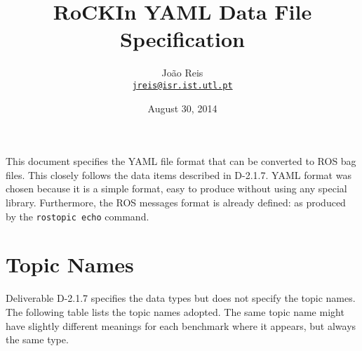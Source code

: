 \documentclass[a4paper]{article}
\author{João Reis\\\href{mailto:jreis@isr.ist.utl.pt}{\nolinkurl{jreis@isr.ist.utl.pt}}}
\title{RoCKIn YAML Data File Specification}
\date{August 30, 2014}
\begin{document}
 

\maketitle


This document specifies the YAML file format that can be converted to ROS bag files. This closely follows the data items described in D-2.1.7.
YAML format was chosen because it is a simple format, easy to produce without using any special library. Furthermore, the ROS messages format
is already defined: as produced by the \verb!rostopic echo! command.


\section{Topic Names}

Deliverable D-2.1.7 specifies the data types but does not specify the topic names. The following table lists the topic names adopted. The same
topic name might have slightly different meanings for each benchmark where it appears, but always the same type.
\end{document}
